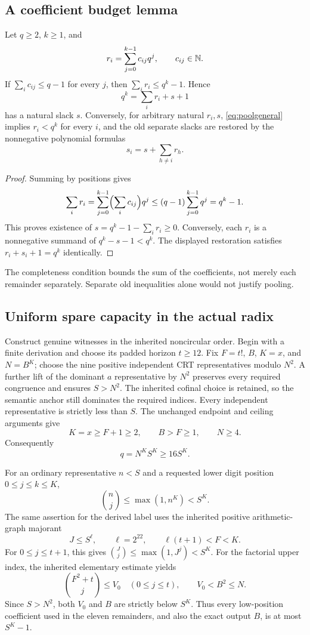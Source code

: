 \subsection{A coefficient budget lemma}
\begin{lemma}\label{lem:digitbudget}
Let $q\ge2$, $k\ge1$, and
\[
 r_i=\sum_{j=0}^{k-1}c_{ij}q^j,\qquad c_{ij}\in\mathbb N.
\]
If $\sum_i c_{ij}\le q-1$ for every $j$, then
$\sum_i r_i\le q^k-1$. Hence
\begin{equation}\label{eq:poolgeneral}
 q^k=\sum_i r_i+s+1
\end{equation}
has a natural slack $s$. Conversely, for arbitrary natural $r_i,s$,
\eqref{eq:poolgeneral} implies $r_i<q^k$ for every $i$, and the old separate
slacks are restored by the nonnegative polynomial formulas
\[
 s_i=s+\sum_{h\ne i}r_h.
\]
\end{lemma}
\begin{proof}
Summing by positions gives
\[
 \sum_i r_i=\sum_{j=0}^{k-1}\Bigl(\sum_i c_{ij}\Bigr)q^j
 \le(q-1)\sum_{j=0}^{k-1}q^j=q^k-1.
\]
This proves existence of $s=q^k-1-\sum_i r_i\ge0$.
Conversely, each $r_i$ is a nonnegative summand of $q^k-s-1<q^k$.
The displayed restoration satisfies $r_i+s_i+1=q^k$ identically.
\end{proof}
The completeness condition bounds the sum of the coefficients, not merely
each remainder separately. Separate old inequalities alone would not
justify pooling.

\subsection{Uniform spare capacity in the actual radix}
Construct genuine witnesses in the inherited noncircular order. Begin with
a finite derivation and choose its padded horizon $t\ge12$. Fix
$F=t!$, $B$, $K=x$, and $N=B^K$; choose the nine positive independent CRT
representatives modulo $N^2$. A further lift of the dominant $a$
representative by $N^2$ preserves every required congruence and ensures
$S>N^2$. The inherited cofinal choice is retained, so the semantic anchor
still dominates the required indices. Every independent representative is
strictly less than $S$. The unchanged endpoint and ceiling arguments give
\[
 K=x\ge F+1\ge2,\qquad B>F\ge1,\qquad N\ge4.
\]
Consequently
\begin{equation}\label{eq:naturalradixmargin}
 q=N^KS^K\ge16S^K.
\end{equation}

For an ordinary representative $n<S$ and a requested lower digit position
$0\le j\le k\le K$,
\[
 \binom nj\le\max(1,n^K)<S^K.
\]
The same assertion for the derived label uses the inherited positive
arithmetic-graph majorant
\[
 J\le S^\ell,\qquad \ell=2^{22},\qquad
 \ell(t+1)<F<K.
\]
For $0\le j\le t+1$, this gives
$\binom Jj\le\max(1,J^j)<S^K$. For the factorial upper index,
the inherited elementary estimate yields
\[
 \binom{F^2+t}{j}\le V_0\quad(0\le j\le t),
 \qquad V_0<B^2\le N.
\]
Since $S>N^2$, both $V_0$ and $B$ are strictly below $S^K$.
Thus every low-position coefficient used in the eleven remainders, and
also the exact output $B$, is at most $S^K-1$.


